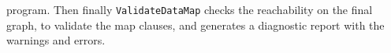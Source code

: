 program.
Then finally \texttt{ValidateDataMap} checks the 
reachability on the final graph, to validate 
the map clauses, and generates 
a diagnostic report with the warnings and errors.
% 
% 

